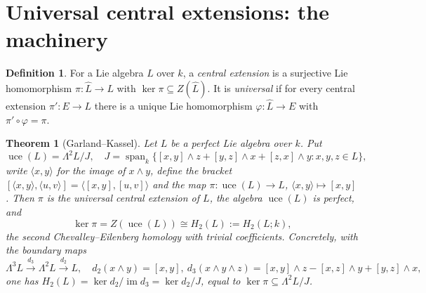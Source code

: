 \documentclass{amsart}
\newtheorem{theorem}{Theorem}
\theoremstyle{definition}
\newtheorem{definition}{Definition}
\DeclareMathOperator{\uce}{uce}
\DeclareMathOperator{\im}{im}
\newcommand{\ra}{\rightarrow}
\begin{document}
\bigskip
\section{Universal central extensions: the machinery}

\begin{definition}\label{def:uce}
For a Lie algebra $L$ over $k$, a \emph{central extension} is a surjective Lie
homomorphism $\pi\colon \widehat L\ra L$ with $\ker\pi\subseteq Z(\widehat L)$. It
is \emph{universal} if for every central extension $\pi'\colon E\ra L$ there is a
unique Lie homomorphism $\varphi\colon\widehat L\ra E$ with
$\pi'\circ\varphi=\pi$.
\end{definition}

\begin{theorem}[Garland--Kassel]\label{thm:uce-exists}
Let $L$ be a perfect Lie algebra over $k$.  Put
\[
   \uce(L)=\Lambda^2L/J,\quad
   J=\operatorname{span}_k\{[x,y]\wedge z+[y,z]\wedge x+[z,x]\wedge y:x,y,z\in L\},
\]
write $\langle x,y\rangle$ for the image of $x\wedge y$, define the bracket
$[\langle x,y\rangle,\langle u,v\rangle]=\langle[x,y],[u,v]\rangle$ and the map
$\pi\colon\uce(L)\ra L$, $\langle x,y\rangle\mapsto[x,y]$.  Then $\pi$ is the
universal central extension of $L$, the algebra $\uce(L)$ is perfect, and
\[
   \ker\pi=Z(\uce(L))\cong H_2(L):=H_2(L;k),
\]
the second Chevalley--Eilenberg homology with trivial coefficients.  Concretely,
with the boundary maps
\[
   \Lambda^3L\xrightarrow{d_3}\Lambda^2L\xrightarrow{d_2}L,\quad
   d_2(x\wedge y)=[x,y],\
   d_3(x\wedge y\wedge z)=[x,y]\wedge z-[x,z]\wedge y+[y,z]\wedge x,
\]
one has $H_2(L)=\ker d_2/\im d_3=\ker d_2/J$, equal to $\ker\pi\subseteq\Lambda^2L/J$.
\end{theorem}
\end{document}

